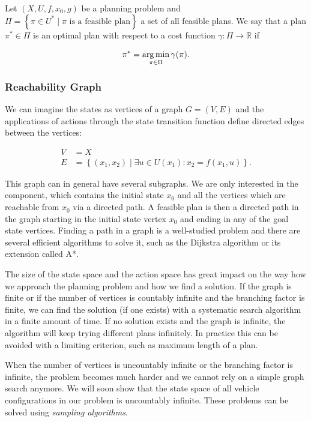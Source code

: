 \begin{defn}
	Let $\left(X, U, f, x_0, g\right)$ be a planning problem and $\Pi=\left\{\pi\in U^* \mid \pi \text{ is a feasible plan}\right\}$ a set of all feasible plans. We say that a plan $\pi^*\in \Pi$ is an optimal plan with respect to a cost function $\gamma: \Pi \rightarrow \mathbb{R}$ if
	
	\[
		\pi^*=\operatorname*{arg\,min}_{\pi\in\Pi} \gamma(\pi).
	\]
\end{defn}

\subsubsection{Reachability Graph}

We can imagine the states as vertices of a graph $G=(V, E)$ and the applications of actions through the state transition function define directed edges between the vertices:

\begin{equation*}
\begin{aligned}
	V&=X \\
	E&=\left\{(x_1, x_2) \mid \exists u \in U(x_1): x_2 = f(x_1, u) \right\}.
\end{aligned}
\end{equation*}

This graph can in general have several subgraphs. We are only interested in the component, which contains the initial state $x_0$ and all the vertices which are reachable from $x_0$ via a directed path. A feasible plan is then a directed path in the graph starting in the initial state vertex $x_0$ and ending in any of the goal state vertices. Finding a path in a graph is a  well-studied problem and there are several efficient algorithms to solve it, such as the Dijkstra algorithm or its extension called A*.

The size of the state space and the action space has great impact on the way how we approach the planning problem and how we find a solution. If the graph is finite or if the number of vertices is countably infinite and the branching factor is finite, we can find the solution (if one exists) with a systematic search algorithm in a finite amount of time. If no solution exists and the graph is infinite, the algorithm will keep trying different plans infinitely. In practice this can be avoided with a limiting criterion, such as maximum length of a plan.

When the number of vertices is uncountably infinite or the branching factor is infinite, the problem becomes much harder and we cannot rely on a simple graph search anymore. We will soon show that the state space of all vehicle configurations in our problem is uncountably infinite. These problems can be solved using \textit{sampling algorithms}.

